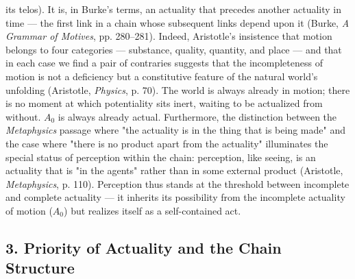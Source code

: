 its telos). It is, in Burke's terms, an actuality that precedes another actuality in time --- the first link in a chain whose subsequent links depend upon it (Burke, \textit{A Grammar of Motives}, pp. 280--281). Indeed, Aristotle's insistence that motion belongs to four categories --- substance, quality, quantity, and place --- and that in each case we find a pair of contraries suggests that the incompleteness of motion is not a deficiency but a constitutive feature of the natural world's unfolding (Aristotle, \textit{Physics}, p. 70). The world is always already in motion; there is no moment at which potentiality sits inert, waiting to be actualized from without. $A_0$ is always already actual. Furthermore, the distinction between the \textit{Metaphysics} passage where "the actuality is in the thing that is being made" and the case where "there is no product apart from the actuality" illuminates the special status of perception within the chain: perception, like seeing, is an actuality that is "in the agents" rather than in some external product (Aristotle, \textit{Metaphysics}, p. 110). Perception thus stands at the threshold between incomplete and complete actuality --- it inherits its possibility from the incomplete actuality of motion ($A_0$) but realizes itself as a self-contained act. 

\subsection*{3. Priority of Actuality and the Chain Structure}

